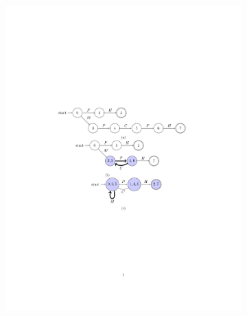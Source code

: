 \documentclass[letterpaper, 11 pt, onecolumn]{article}
\begin{document}
\begin{figure}[t!]
    \centering
    \begin{subfigure}[b]{0.4\textwidth}
        \centering
\includegraphics[width=\textwidth]{fig/original.pdf}        \caption{}
    \end{subfigure}%
    \begin{subfigure}[b]{0.3\textwidth}
        \centering

\end{subfigure}
\end{figure}
\end{document}
